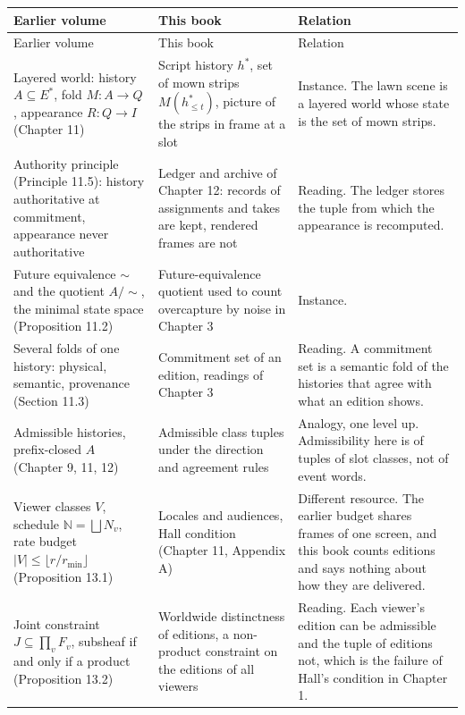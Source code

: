 \documentclass[11pt,twoside,openright]{book}
\theoremstyle{plain}
\theoremstyle{definition}
\theoremstyle{remark}
\begin{document}
\begin{longtable}{@{}>{\raggedright\arraybackslash}p{3.7cm}>{\raggedright\arraybackslash}p{3.7cm}>{\raggedright\arraybackslash}p{5.1cm}@{}}
\toprule
Earlier volume & This book & Relation\\
\midrule
\endfirsthead
\toprule
Earlier volume & This book & Relation\\
\midrule
\endhead
\bottomrule
\endfoot
Layered world: history $A\subseteq E^\ast$, fold $M:A\to Q$, appearance $R:Q\to I$ (Chapter 11) & Script history $h^\ast$, set of mown strips $M(h^\ast_{\le t})$, picture of the strips in frame at a slot & Instance. The lawn scene is a layered world whose state is the set of mown strips.\\
Authority principle (Principle 11.5): history authoritative at commitment, appearance never authoritative & Ledger and archive of Chapter 12: records of assignments and takes are kept, rendered frames are not & Reading. The ledger stores the tuple from which the appearance is recomputed.\\
Future equivalence $\sim$ and the quotient $A/{\sim}$, the minimal state space (Proposition 11.2) & Future-equivalence quotient used to count overcapture by noise in Chapter 3 & Instance.\\
Several folds of one history: physical, semantic, provenance (Section 11.3) & Commitment set of an edition, readings of Chapter 3 & Reading. A commitment set is a semantic fold of the histories that agree with what an edition shows.\\
Admissible histories, prefix-closed $A$ (Chapter 9, 11, 12) & Admissible class tuples under the direction and agreement rules & Analogy, one level up. Admissibility here is of tuples of slot classes, not of event words.\\
Viewer classes $V$, schedule $\mathbb N=\bigsqcup N_v$, rate budget $\lvert V\rvert\le\lfloor r/r_{\min}\rfloor$ (Proposition 13.1) & Locales and audiences, Hall condition (Chapter 11, Appendix A) & Different resource. The earlier budget shares frames of one screen, and this book counts editions and says nothing about how they are delivered.\\
Joint constraint $J\subseteq\prod_vF_v$, subsheaf if and only if a product (Proposition 13.2) & Worldwide distinctness of editions, a non-product constraint on the editions of all viewers & Reading. Each viewer's edition can be admissible and the tuple of editions not, which is the failure of Hall's condition in Chapter 1.\\

\end{longtable}
\end{document}
